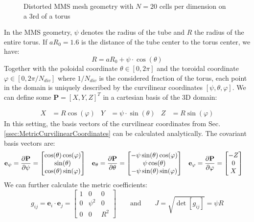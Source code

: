 \begin{figure}[H]
\begin{subfigure}[b]{0.4\textwidth}
		\label{fig:MMSModelTorturedCrossSection}
	\end{subfigure}	
	\caption[Distorted MMS mesh geometry with $N=20$ cells per dimension on a 3rd of a torus]{Distorted MMS mesh geometry with $N=20$ cells per dimension on a 3rd of a torus}
	\label{fig:MMSModelScheme}
\end{figure}

In the MMS geometry, $\psi$ denotes the radius of the tube and $R$ the radius of the entire torus. If $aR_0=1.6$ is the distance of the tube center to the torus center, we have:
$$  R = aR_0 + \psi\cdot\cos(\theta) $$
Together with the poloidal coordinate $\theta\in[0,2\pi]$ and the toroidal coordinate $\varphi\in[0,2\pi/N_{div}]$ where $1/N_{div}$ is the considered fraction of the torus, each point in the domain is uniquely described by the curvilinear coordinates $[\psi,\theta,\varphi]$. 
We can define some $\mathbf{P} = [X,Y,Z]^T$ in a cartesian basis of the 3D domain:

\begin{align*}
	X &= R\cos(\varphi) &  Y &= \psi\cdot\sin(\theta)  &  Z &= R\sin(\varphi)
\end{align*} 
In this setting, the basis vectors of the curvilinear coordinates from Sec. \ref{ssec:MetricCurvilinearCoordinates} can be calculated analytically. The covariant basis vectors are:
\begin{align*}
	\mathbf{e}_\psi &= \pdv{\mathbf{P}}{\psi} = \begin{bmatrix} \cos(\theta)\cos(\varphi) \\ \sin(\theta) \\ \cos(\theta)\sin(\varphi) \end{bmatrix} & \mathbf{e}_\theta &= \pdv{\mathbf{P}}{\theta} = \begin{bmatrix} -\psi\sin(\theta)\cos(\varphi) \\ \psi\cos(\theta) \\ -\psi\sin(\theta)\sin(\varphi) \end{bmatrix} & \mathbf{e}_\varphi &= \pdv{\mathbf{P}}{\varphi} = \begin{bmatrix} -Z \\ 0 \\ X \end{bmatrix}
\end{align*}
We can further calculate the metric coefficients:
$$ g_{ij} = \mathbf{e}_i\cdot\mathbf{e}_j
= \begin{bmatrix}
	1 & 0 & 0 \\ 0 & \psi^2 & 0 \\ 0 & 0 & R^2
\end{bmatrix} \qquad \text{and} \qquad J = \sqrt{\det[g_{ij}]} = \psi R$$
 
